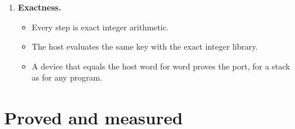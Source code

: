 \begin{enumerate}
\begin{itemize}
\begin{itemize}
\item a table (a sub-function of up to 32 input bits becomes one lookup, and composition retains its order);
\item narrower registers (fewer limbs a step);
\item folded, dropped and shared steps (below: steps and their reduction).
\end{itemize}
\end{itemize}
\item \textbf{Exactness.}

\begin{itemize}
\item Every step is exact integer arithmetic.
\item The host evaluates the same key with the exact integer library.
\item A device that equals the host word for word proves the port, for a stack as for any program.
\end{itemize}
\end{enumerate}

\section{\texorpdfstring{Proved and measured}{Proved and measured}}

